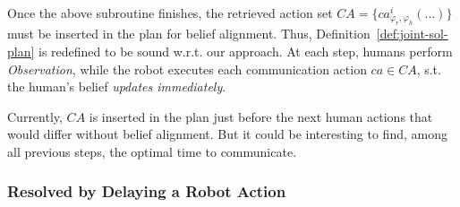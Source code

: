 \documentclass[letterpaper]{article} %
\begin{document}
Once the above subroutine finishes, the retrieved action set $\mathit{CA} = \{ca^{i}_{\varphi_r,\varphi_h}(...)\}$ must be inserted in the plan for belief alignment. Thus, Definition~\ref{def:joint-sol-plan} is redefined to be sound w.r.t. our approach. 
At each step,
humans perform \textit{Observation}, while the robot executes each communication action $ca \in \mathit{CA}$, s.t. the human's belief \textit{updates immediately}.

Currently, $\mathit{CA}$ is inserted in the plan just before the next human actions that would differ without belief alignment. But it could be interesting to find, among all previous steps, the optimal time to communicate.  


\subsubsection{Resolved by Delaying a Robot Action}
\end{document}
